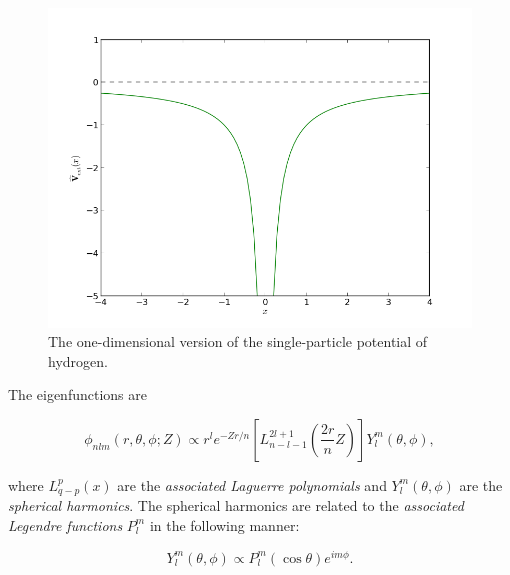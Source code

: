 \begin{frame}
\begin{figure}
 \begin{center}
  \includegraphics[scale=0.4]{../graphics/Potentials/hydrogen.png}
  \caption{The one-dimensional version of the single-particle potential of hydrogen.}
  \label{fig:extPotHydrogen}
 \end{center}
\end{figure}
\end{frame}

\begin{frame}
 The eigenfunctions are
 
 \begin{equation*}
 \phi_{nlm}(r, \theta, \phi; Z) \propto r^l e^{-Zr/n}\left[L_{n-l-1}^{2l+1}\left(\frac{2r}{n}Z\right)\right] Y_l^m(\theta, \phi), 
\end{equation*}

where $L_{q-p}^p(x)$ are the \textit{associated Laguerre polynomials} and $Y_l^m(\theta, \phi)$ are the \textit{spherical harmonics}. 
\shift
The spherical harmonics are related to the \textit{associated Legendre functions} $P_l^m$ in the following manner:

\begin{equation}
 Y_l^m(\theta, \phi) \propto   P_l^m(\cos\theta)e^{im\phi}. \label{eq:spherHarm}
\end{equation}

\end{frame}

